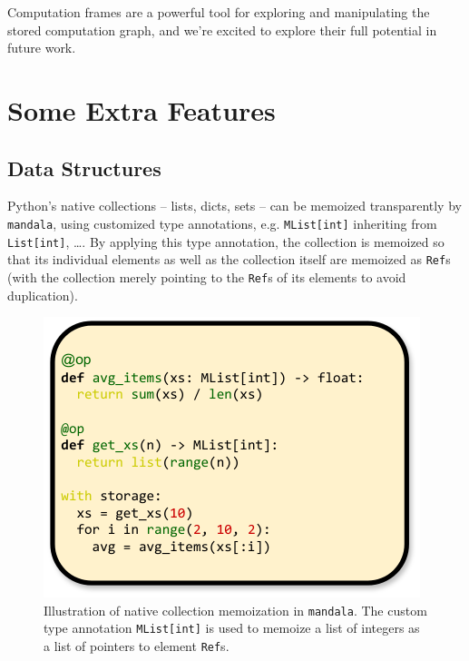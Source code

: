 \documentclass{article} %
\begin{document}
Computation frames are a powerful tool for exploring and manipulating the stored
computation graph, and we're excited to explore their full potential in future
work.

\section{Some Extra Features}
\label{section:extra-features}

\subsection{Data Structures}
\label{subsection:data-structures}

Python's native collections -- lists, dicts, sets -- can be memoized
transparently by \texttt{mandala}, using customized type annotations, e.g.
\texttt{MList[int]} inheriting from \texttt{List[int]}, \ldots. By applying this
type annotation, the collection is memoized so that its individual elements as
well as the collection itself are memoized as \texttt{Ref}s (with the collection
merely pointing to the \texttt{Ref}s of its elements to avoid duplication). 

\begin{figure}
    \centering
    \includegraphics[width=\linewidth]{img/list.pdf}
    \caption{Illustration of native collection memoization in \texttt{mandala}.
    The custom type annotation \texttt{MList[int]} is used to memoize a list of
    integers as a list of pointers to element \texttt{Ref}s.}
    \label{fig:list}
\end{figure}
\end{document}
